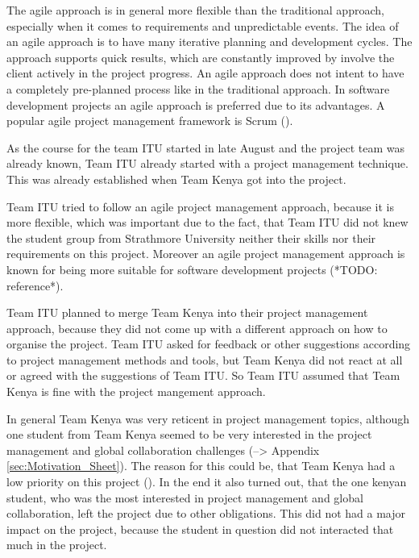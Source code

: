 
The agile approach is in general more flexible than the traditional approach, especially when it comes to requirements and unpredictable events. The idea of an agile approach is to have many iterative planning and development cycles. The approach supports quick results, which are constantly improved by involve the client actively in the project progress. An agile approach does not intent to have a completely pre-planned process like in the traditional approach. In software development projects an agile approach is preferred due to its advantages. A popular agile project management framework is Scrum ().

As the course for the team ITU started in late August and the project team was already known, Team ITU already started with a project management technique. This was already established when Team Kenya got into the project.

Team ITU tried to follow an agile project management approach, because it is more flexible, which was important due to the fact, that Team ITU did not knew the student group from Strathmore University neither their skills nor their requirements on this project. Moreover an agile project management approach is known for being more suitable for software development projects (*TODO: reference*).

Team ITU planned to merge Team Kenya into their project management approach, because they did not come up with a different approach on how to organise the project. Team ITU asked for feedback or other suggestions according to project management methods and tools, but Team Kenya did not react at all or agreed with the suggestions of Team ITU. So Team ITU assumed that Team Kenya is fine with the project mangement approach.

In general Team Kenya was very reticent in project management topics, although one student from Team Kenya seemed to be very interested in the project management and global collaboration challenges (--> Appendix \ref{sec:Motivation_Sheet}). The reason for this could be, that Team Kenya had a low priority on this project (). In the end it also turned out, that the one kenyan student, who was the most interested in project management and global collaboration, left the project due to other obligations. This did not had a major impact on the project, because the student in question did not interacted that much in the project.

